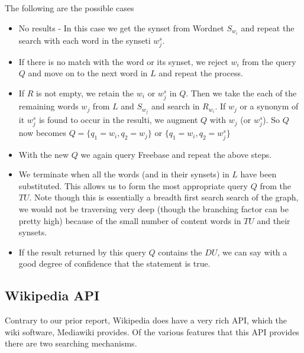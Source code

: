 \documentclass[11pt]{article}
\begin{document}
 The following are the possible cases
\begin{itemize}
\item No results - In this case we get the synset from Wordnet $S_{w_{i}}$ and repeat the search with each word in the synseti $w_{j}^{s}$.
\item If there is no match with the word or its synset, we reject $w_{i}$ from the query $Q$ and move on to the next word in $L$ and repeat the process.
\item If $R$ is not empty, we retain the $w_{i}$ or $w_{j}^{s}$ in $Q$. Then we take the each of the remaining words $w_{j}$ from $L$ and $S_{w_{j}}$ and search in $R_{w_{i}}$. If $w_{j}$ or a synonym of it $w_{j}^{s}$ is found to occur in the resulti, we augment $Q$ with $w_{j}$ (or $w_{j}^{s}$). So $Q$ now becomes $Q =\{q_{1}=w_{i}, q_{2}=w_{j}\}$ or $\{q_{1}=w_{i},q_{2}=w_{j}^{s}\}$ 
\item With the new $Q$ we again query Freebase and repeat the above steps.
\item We terminate when all the words (and in their synsets) in $L$ have been substituted. This allows us to form the most appropriate query $Q$ from the $TU$. Note though this is essentially a breadth first search search of the graph, we would not be traversing very deep (though the branching factor can be pretty high) because of the small number of content words in $TU$ and their synsets.
\item If the result returned by this query $Q$ contains the $DU$, we can say with a good degree of confidence that the statement is true.    
\end{itemize}
%
%


\subsection{Wikipedia API}

\label{March9to29}
Contrary to our prior report, Wikipedia does have a very rich API, which the wiki software, Mediawiki provides. Of the various features that this API provides there are two searching mechanisms. 
\end{document}

